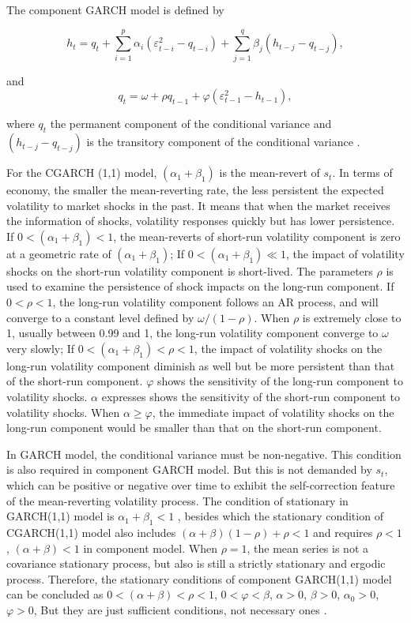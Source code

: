 The component GARCH model is defined by

\begin{equation}
h_{t}=q_{t}+\sum_{i=1}^{p}\alpha_{i}(\varepsilon_{t-i}^{2}-q_{t-i}) + \sum_{j=1}^{q}\beta_{j}(h_{t-j}-q_{t-j}),
\end{equation}

and
\begin{equation}
q_{t} = \omega + \rho q_{t-1}  +\varphi(\varepsilon_{t-1}^{2}-h_{t-1}),
\end{equation}

where $q_{t}$ the permanent component of the conditional variance and $(h_{t-j}-q_{t-j})$ is the transitory component of the conditional variance \citep{0-19-829683-5,Ghalanos2011}. 

For the CGARCH (1,1) model, $(\alpha_1 +  \beta_1)$ is the mean-revert of $s_{t}$. In terms of economy, the smaller the mean-reverting rate, the less persistent the expected volatility to market shocks in the past. It means that when the market receives the information of shocks, volatility responses quickly but has lower persistence. If $0<(\alpha_1 +  \beta_1)<1$, the mean-reverts of short-run volatility component is zero at a geometric rate of  $(\alpha_1 +  \beta_1)$;  If $0<(\alpha_1 +  \beta_1)\ll1$, the impact of volatility shocks on the short-run volatility component is short-lived. The parameters $\rho$  is used to examine the persistence of shock impacts on the long-run component. If $0<\rho<1$,  the long-run volatility component follows an AR process, and will converge to a constant level defined by $\omega/(1-\rho)$. When  $\rho$ is extremely close to 1, usually between 0.99 and 1, the long-run volatility component converge to $\omega$ very slowly; If $0<(\alpha_1 +  \beta_1)<\rho<1$, the impact of volatility shocks on the long-run volatility component diminish as well but be more persistent than that of the short-run component. $\varphi$ shows the sensitivity of the  long-run component to volatility shocks. $\alpha$ expresses shows the sensitivity of the  short-run component to volatility shocks. When $\alpha\geq\varphi$, the immediate impact of volatility shocks on the long-run component would be smaller than that on the short-run component.

In GARCH model, the conditional variance must be non-negative. This condition is also required in component GARCH model. But this is not demanded by $s_{t}$, which can be positive or negative over time to exhibit the self-correction feature of the mean-reverting volatility process. The condition of stationary in GARCH(1,1) model is  $\alpha_{1} + \beta_{1}<1$ , besides which the stationary condition of CGARCH(1,1) model also includes $(\alpha + \beta)(1-\rho)+\rho<1$ and requires $\rho<1$, $(\alpha + \beta)<1$ in component model. When $\rho=1$, the mean series is not a covariance stationary process, but also is still a strictly stationary and ergodic process. Therefore, the stationary conditions of component GARCH(1,1) model can be concluded as $0<(\alpha + \beta)< \rho<1$, $0<\varphi<\beta$, $\alpha>0$, $\beta>0$, $\alpha_{0}>0$, $\varphi>0$, But they are just sufficient conditions, not necessary ones \citep{0-19-829683-5}.